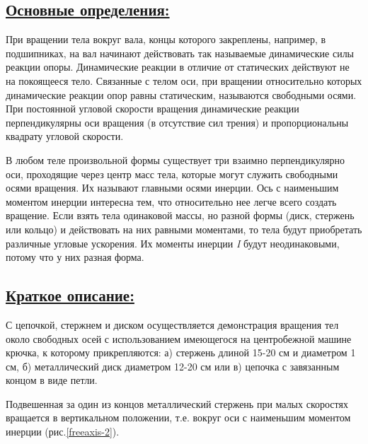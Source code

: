 \documentclass[14pt,a4paper,oneside]{extarticle}	%
\begin{document}
\newpage
\subsection*{\underline{Основные определения:}}

%

При вращении тела вокруг вала, концы которого закреплены, например, в подшипниках, на вал начинают действовать так называемые динамические силы реакции опоры.
Динамические реакции в отличие от статических действуют не на покоящееся тело.
Связанные с телом оси, при вращении относительно которых динамические реакции опор равны статическим, называются свободными осями.
При постоянной угловой скорости вращения динамические реакции перпендикулярны оси вращения (в отсутствие сил трения) и пропорциональны квадрату угловой скорости.

В любом теле произвольной формы существует три взаимно перпендикулярно оси, проходящие через центр масс тела, которые могут служить свободными осями вращения.
Их называют главными осями инерции.
Ось с наименьшим моментом инерции интересна тем, что относительно нее легче всего создать вращение.
Если взять тела одинаковой массы, но разной формы (диск, стержень или кольцо) и действовать на них равными моментами, то тела будут приобретать различные угловые ускорения. 
Их моменты инерции \textit{I} будут неодинаковыми, потому что у них разная форма.

\newpage
\subsection*{\underline{Краткое описание:}}

С цепочкой, стержнем и диском осуществляется демонстрация вращения тел около свободных осей с использованием имеющегося на центробежной машине крючка, к которому прикрепляются: а) стержень длиной 15-20 см и диаметром 1 см, б) металлический диск диаметром 12-20 см или в) цепочка с завязанным концом в виде петли.

Подвешенная за один из концов металлический стержень при малых скоростях вращается в вертикальном положении, т.е. вокруг оси с наименьшим моментом инерции (рис.\ref{freeaxis-2}).
\end{document}
